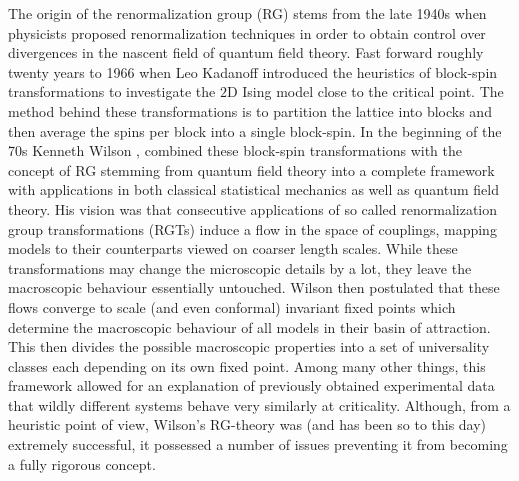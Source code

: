 \documentclass{article}
\begin{document}
The origin of the renormalization group (RG) stems from the late 1940s when physicists proposed renormalization techniques in order to obtain control over divergences in the nascent field of quantum field theory. Fast forward roughly twenty years to 1966 when Leo Kadanoff \cite{Kadanoff} introduced the heuristics of block-spin transformations to investigate the $2\mathrm{D}$ Ising model close to the critical point. The method behind these transformations is to partition the lattice into blocks and then average the spins per block into a single block-spin. In the beginning of the 70s Kenneth Wilson \cite{WilsonI},\cite{WilsonII} combined these block-spin transformations with the concept of RG stemming from quantum field theory into a complete framework with applications in both classical statistical mechanics as well as quantum field theory. His vision was that consecutive applications of so called renormalization group transformations (RGTs) induce a flow in the space of couplings, mapping models to their counterparts viewed on coarser length scales. While these transformations may change the microscopic details by a lot, they leave the macroscopic behaviour essentially untouched. Wilson then postulated that these flows converge to scale (and even conformal) invariant fixed points which determine the macroscopic behaviour of all models in their basin of attraction. This then divides the possible macroscopic properties into a set of universality classes each depending on its own fixed point. Among many other things, this framework allowed for an explanation of previously obtained experimental data that wildly different systems behave very similarly at criticality. Although, from a heuristic point of view, Wilson's RG-theory was (and has been so to this day) extremely successful, it possessed a number of issues preventing it from becoming a fully rigorous concept.\smallskip 
\end{document}
